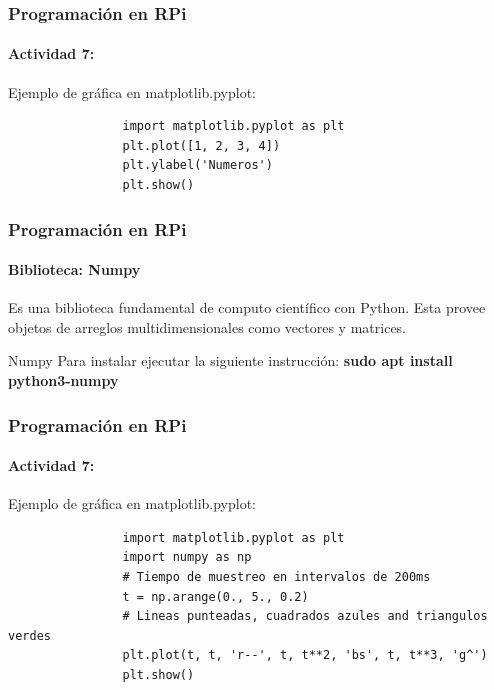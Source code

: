 \documentclass{beamer}
\begin{document}
	\begin{frame}[fragile]
		\frametitle{Programación en RPi}
		\framesubtitle{Actividad 7:}
		\begin{mybox}{Ejemplo de gráfica en matplotlib.pyplot:}
			\begin{lstlisting}
				import matplotlib.pyplot as plt
				plt.plot([1, 2, 3, 4])
				plt.ylabel('Numeros')
				plt.show()
			\end{lstlisting}
		\end{mybox}
	\end{frame}
	\begin{frame}
		\frametitle{Programación en RPi}
		\framesubtitle{Biblioteca: Numpy}
		Es una biblioteca fundamental de computo científico con Python. Esta provee objetos de arreglos multidimensionales como vectores y matrices.
		\begin{mybox}{Numpy}
			Para instalar ejecutar la siguiente instrucción: \textbf{sudo apt install python3-numpy}
		\end{mybox}
	\end{frame}
	
	\begin{frame}[fragile]
		\frametitle{Programación en RPi}
		\framesubtitle{Actividad 7:}
		\begin{mybox}{Ejemplo de gráfica en matplotlib.pyplot:}
			\begin{lstlisting}
				import matplotlib.pyplot as plt
				import numpy as np
				# Tiempo de muestreo en intervalos de 200ms 
				t = np.arange(0., 5., 0.2)
				# Lineas punteadas, cuadrados azules and triangulos verdes
				plt.plot(t, t, 'r--', t, t**2, 'bs', t, t**3, 'g^')
				plt.show()
			\end{lstlisting}
		\end{mybox}
	\end{frame}
	
\end{document}
